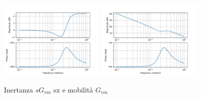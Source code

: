 \begin{figure}[h]
    \centering
    \includegraphics[width=0.45\textwidth]{Immagini/Inertanza_gvm.png}
    \includegraphics[width=0.45\textwidth]{Immagini/mobilita_gvm.png}
    \caption{Inertanza \(sG_{vm}\) sx e mobilità \(G_{vm}\)}
\end{figure}

